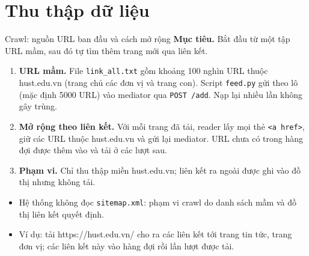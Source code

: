 \documentclass[aspectratio=169,t,10pt]{beamer}
\newcommand{\code}[1]{\texttt{#1}}
\newcommand{\ex}[1]{{\ttfamily\footnotesize #1}}
\newcommand{\muctieu}[1]{\noindent\textbf{Mục tiêu.} #1\par\vspace{4pt}}
\begin{document}
\section{Thu thập dữ liệu}
\begin{frame}{Crawl: nguồn URL ban đầu và cách mở rộng}
\small
\muctieu{Bắt đầu từ một tập URL mầm, sau đó tự tìm thêm trang mới qua liên kết.}
\begin{enumerate}
  \setlength{\itemsep}{4pt}
  \item \textbf{URL mầm.} File \code{link\_all.txt} gồm khoảng 100 nghìn URL thuộc hust.edu.vn (trang chủ các đơn vị và trang con). Script \code{feed.py} gửi theo lô (mặc định 5000 URL) vào mediator qua \code{POST /add}. Nạp lại nhiều lần không gây trùng.
  \item \textbf{Mở rộng theo liên kết.} Với mỗi trang đã tải, reader lấy mọi thẻ \code{<a href>}, giữ các URL thuộc hust.edu.vn và gửi lại mediator. URL chưa có trong hàng đợi được thêm vào và tải ở các lượt sau.
  \item \textbf{Phạm vi.} Chỉ thu thập miền hust.edu.vn; liên kết ra ngoài được ghi vào đồ thị nhưng không tải.
\end{enumerate}
\vspace{4pt}
\begin{itemize}
  \item Hệ thống không đọc \code{sitemap.xml}: phạm vi crawl do danh sách mầm và đồ thị liên kết quyết định.
  \item Ví dụ: tải \ex{https://hust.edu.vn/} cho ra các liên kết tới trang tin tức, trang đơn vị; các liên kết này vào hàng đợi rồi lần lượt được tải.
\end{itemize}
\end{frame}
\end{document}

